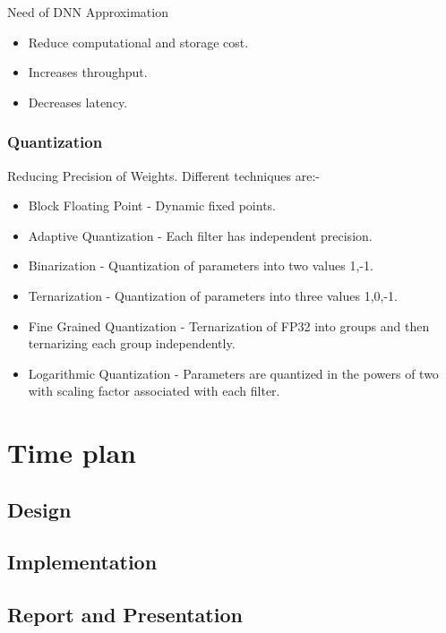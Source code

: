 \documentclass[titlepage]{report}
\begin{document}
\begin{itemize}
Need of DNN Approximation
\begin{itemize}
    \item Reduce computational and storage cost.
    \item Increases throughput.
    \item Decreases latency.
\end{itemize}

\subsection{Quantization}
Reducing Precision of Weights. Different techniques are:-
\begin{itemize}
\item  Block Floating Point - Dynamic fixed points.
\item Adaptive Quantization - Each filter has independent precision.
\item Binarization - Quantization of parameters into two values {1,-1}.
\item Ternarization - Quantization of parameters into three values {1,0,-1}.
\item Fine Grained Quantization - Ternarization of FP32 into groups and then ternarizing each group independently.
\item Logarithmic Quantization - Parameters are quantized in the powers of two with scaling factor associated with each filter.
\end{itemize}


\chapter{Time plan}

\section{Design}
\lipsum[3]

\section{Implementation}
\lipsum[3]

\section{Report and Presentation}
\lipsum[3]


\end{itemize}
\end{document}
